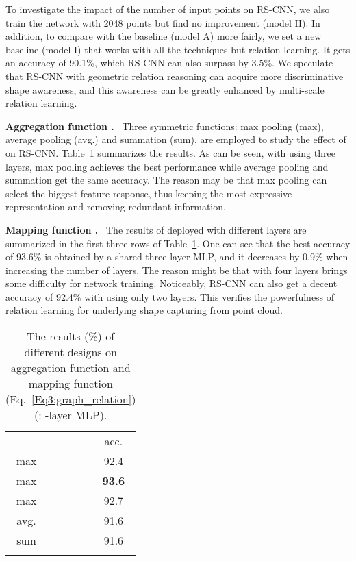 \documentclass[10pt,twocolumn,letterpaper]{article}
\begin{document}
To investigate the impact of the number of input points on RS-CNN, we also train the network with 2048 points but find no improvement (model H). In addition, to compare with the baseline (model A) more fairly, we set a new baseline (model I) that works with all the techniques but relation learning. It gets an accuracy of 90.1\%, which RS-CNN can also surpass by 3.5\%. We speculate that RS-CNN with geometric relation reasoning can acquire more discriminative shape awareness, and this awareness can be greatly enhanced by multi-scale relation learning.

\vspace{12pt}
\noindent \textbf{Aggregation function .}\,\,~Three symmetric functions: max pooling (max), average pooling (avg.) and summation (sum), are employed to study the effect of  on RS-CNN. Table~\ref{Tab5:inner_out_func} summarizes the results. As can be seen, with  using three layers, max pooling achieves the best performance while average pooling and summation get the same accuracy. The reason may be that max pooling can select the biggest feature response, thus keeping the most expressive representation and removing redundant information.

\vspace{12pt}
\noindent \textbf{Mapping function .}\,\,~The results of  deployed with different layers are summarized in the first three rows of Table~\ref{Tab5:inner_out_func}. One can see that the best accuracy of 93.6\% is obtained by a shared three-layer MLP, and it decreases by 0.9\% when increasing the number of layers. The reason might be that  with four layers brings some difficulty for network training. Noticeably, RS-CNN can also get a decent accuracy of 92.4\% with  using only two layers. This verifies the powerfulness of relation learning for underlying shape capturing from point cloud.

\begin{table}[t]
  \centering
\caption{The results (\%) of different designs on aggregation function  and mapping function  (Eq.~\eqref{Eq3:graph_relation}) (: -layer MLP).}
  \begin{tabular}{c|ccc|c}
  \Xhline{0.8pt}
   &  &  &  & acc. \\
\Xhline{0.5pt}
  max &  &  &  & 92.4 \\
  max & &  &  & \textbf{93.6} \\
  max &  &  &  & 92.7 \\
  avg. &  &  &  & 91.6 \\
  sum &  &  &  & 91.6 \\
  \Xhline{0.8pt}
  \end{tabular}
  \label{Tab5:inner_out_func}
  \vspace{10pt}
\end{table}
\end{document}
